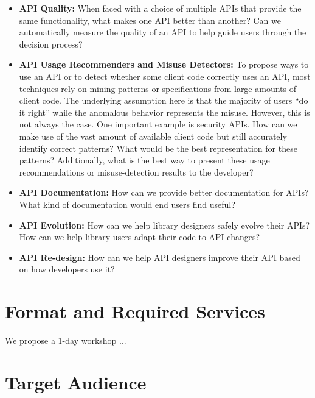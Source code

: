 \documentclass[10pt, conference]{IEEEtran}
\begin{document}
\begin{itemize}
\item \textbf{API Quality:} When faced with a choice of multiple APIs that provide the same functionality, what makes one API better than another? Can we automatically measure the quality of an API to help guide users through the decision process?

\item \textbf{API Usage Recommenders and Misuse Detectors:} To propose ways to use an API or to detect whether some client code correctly uses an API, most techniques rely on mining patterns or specifications from large amounts of client code. The underlying assumption here is that the majority of users ``do it right'' while the anomalous behavior represents the misuse. However, this is not always the case. One important example is security APIs. How can we make use of the vast amount of available client code but still accurately identify correct patterns? What would be the best representation for these patterns? Additionally, what is the best way to present these usage recommendations or misuse-detection results to the developer? 

\item\textbf{API Documentation:} How can we provide better documentation for APIs? What kind of documentation would end users find useful?

\item \textbf{API Evolution:} How can we help library designers safely evolve their APIs? How can we help library users adapt their code to API changes?

\item \textbf{API Re-design:} How can we help API designers improve their API based on how developers use it?
\end{itemize}



\section{Format and Required Services}

We propose a 1-day workshop ...

\section{Target Audience}
\end{document}
